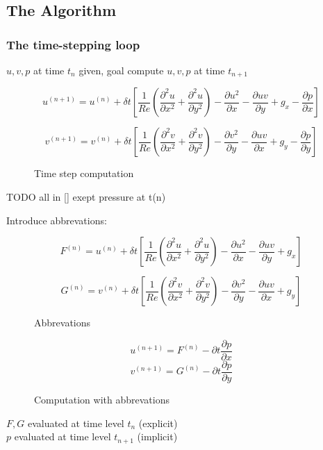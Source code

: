 \subsection{The Algorithm}

\subsubsection{The time-stepping loop}
$u,v,p$ at time $t_n$ given, goal compute $u,v,p$ at time $t_{n+1}$

\begin{figure}[H]
	\centering
   \[u^{(n+1)} = u^{(n)} + \delta t \left[ \frac{1}{Re}\left(\frac{\partial^2 u}{\partial x^2} + \frac{\partial^2 u}{\partial y^2}\right) - \frac{\partial u^2}{\partial x} - \frac{\partial uv}{\partial y} + g_x - \frac{\partial p}{\partial x}\right]\]

   \[v^{(n+1)} = v^{(n)} + \delta t \left[ \frac{1}{Re}\left(\frac{\partial^2 v}{\partial x^2} + \frac{\partial^2 v}{\partial y^2}\right) - \frac{\partial v^2}{\partial y} - \frac{\partial uv}{\partial x} + g_y - \frac{\partial p}{\partial y}\right]\]
   \renewcommand{\thefigure}{3.38 TODO number???}
	\caption{Time step computation}
	\label{fig:time-step}
\end{figure}

TODO all in [] exept pressure at t(n)

Introduce abbrevations:
\begin{figure}[H]
	\centering
   \[F^{(n)} = u^{(n)} + \delta t \left[ \frac{1}{Re}\left(\frac{\partial^2 u}{\partial x^2} + \frac{\partial^2 u}{\partial y^2}\right) - \frac{\partial u^2}{\partial x} - \frac{\partial uv}{\partial y} + g_x\right]\]

   \[G^{(n)} = v^{(n)} + \delta t \left[ \frac{1}{Re}\left(\frac{\partial^2 v}{\partial x^2} + \frac{\partial^2 v}{\partial y^2}\right) - \frac{\partial v^2}{\partial y} - \frac{\partial uv}{\partial x} + g_y\right]\]
	\renewcommand{\thefigure}{3.29}
	\caption{Abbrevations}
	\label{fig:abbr}
\end{figure}

\begin{figure}[H]
	\centering
   \[u^{(n+1)} = F^{(n)} - \partial t \frac{\partial p}{\partial x}\]
   \[v^{(n+1)} = G^{(n)} - \partial t \frac{\partial p}{\partial y}\]
	\renewcommand{\thefigure}{3.30, 3.31}
	\caption{Computation with abbrevations}
	\label{fig:comp-fg}
\end{figure}

$F,G$ evaluated at time level $t_n$ (explicit)\\
$p$ evaluated at time level $t_{n+1}$ (implicit)\\


